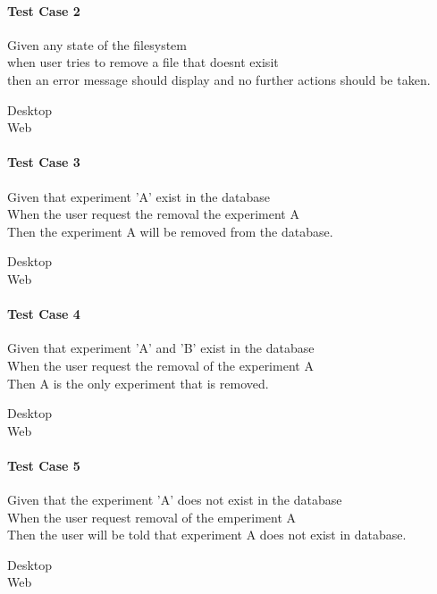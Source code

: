 \paragraph*{Test Case 2}
Given any state of the filesystem \\ when user tries to remove a file that doesnt exisit \\ then an error message should display and no further actions should be taken.
\begin{description}
 \item[Desktop]
 \item[Web]
\end{description}
\paragraph*{Test Case 3}
Given that experiment 'A' exist in the database \\ When the user request the removal the experiment A \\ Then the experiment A will be removed from the database.
\begin{description}
 \item[Desktop]
 \item[Web]
\end{description}
\paragraph*{Test Case 4}
Given that experiment 'A' and 'B' exist in the database \\ When the user request the removal of the experiment A \\ Then A is the only experiment that is removed.
\begin{description}
 \item[Desktop]
 \item[Web]
\end{description}
\paragraph*{Test Case 5}
Given that the experiment 'A' does not exist in the database \\ When the user request removal of the emperiment A \\ Then the user will be told that experiment A does not exist in database.
\begin{description}
 \item[Desktop]
 \item[Web]
\end{description}
